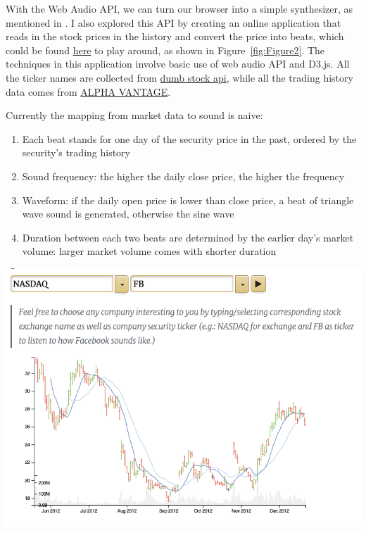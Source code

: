 \documentclass[man]{apa6}
\begin{document}
With the Web Audio API, we can turn our browser into a simple synthesizer, as mentioned in \textcite{roberts2013web}. I also explored this API by creating an online application that reads in the stock prices in the history and convert the price into beats, which could be found \href{https://nianze.tk/2018/12/use-trading-market-data-to-create-beat-sounds/}{here} to play around, as shown in Figure~\ref{fig:Figure2}. The techniques in this application involve basic use of web audio API and D3.js. All the ticker names are collected from \href{https://dumbstockapi.com/}{dumb stock api}, while all the trading history data comes from \href{https://www.alphavantage.co/}{ALPHA VANTAGE}. 

Currently the mapping from market data to sound is naive:

\begin{enumerate}
  \item Each beat stands for one day of the security price in the past, ordered by the security's trading history
  \item Sound frequency: the higher the daily close price, the higher the frequency
  \item Waveform: if the daily open price is lower than close price, a beat of triangle wave sound is generated, otherwise the sine wave
  \item Duration between each two beats are determined by the earlier day's market volume: larger market volume comes with shorter duration
\end{enumerate}

\begin{center}
  \includegraphics[width=\linewidth]{trade_beats.png}
  \label{fig:Figure2}
\end{center}
\end{document}
